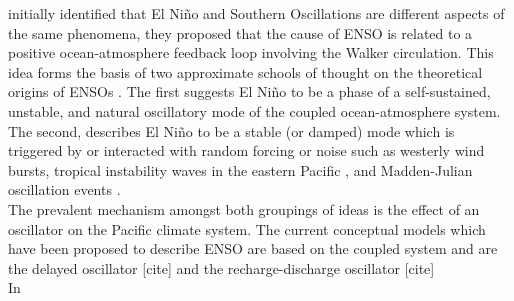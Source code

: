 \documentclass[12pt, onecolumn]{revtex4}    %
\begin{document}
\cite{doi:10.1175/1520-04931969097} initially identified that El Ni\~{n}o and Southern Oscillations are different aspects of the same phenomena, they proposed that the cause of ENSO is related to a positive ocean-atmosphere feedback loop involving the Walker circulation. This idea forms the basis of two approximate schools of thought on the theoretical origins of ENSOs \citep{wang2017nino}. The first suggests El Ni\~{n}o to be a phase of a self-sustained, unstable, and natural oscillatory mode of the coupled ocean-atmosphere system. The second, describes El Ni\~{n}o to be a stable (or damped) mode which is triggered by or interacted with random forcing or noise such as westerly wind bursts, tropical instability waves in the eastern Pacific \citep{An:2008aa}, and Madden-Julian oscillation events \citep{doi:10.1175/JAS4029.1}.  \\

The prevalent mechanism amongst both groupings of ideas is the effect of an oscillator on the Pacific climate system. The current conceptual models which have been proposed to describe ENSO are based on the coupled system and are the delayed oscillator [cite] and the recharge-discharge oscillator [cite] \\


In \\





\newpage

\nocite{ruddiman_climate}


\end{document}
